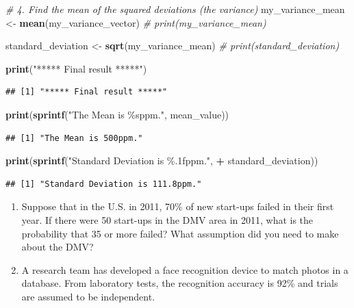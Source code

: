 \documentclass[
]{article}
\newenvironment{Shaded}{\begin{snugshade}}{\end{snugshade}}
\newcommand{\CommentTok}[1]{\textcolor[rgb]{0.56,0.35,0.01}{\textit{#1}}}
\newcommand{\FunctionTok}[1]{\textcolor[rgb]{0.13,0.29,0.53}{\textbf{#1}}}
\newcommand{\NormalTok}[1]{#1}
\newcommand{\OtherTok}[1]{\textcolor[rgb]{0.56,0.35,0.01}{#1}}
\newcommand{\SpecialCharTok}[1]{\textcolor[rgb]{0.81,0.36,0.00}{\textbf{#1}}}
\newcommand{\StringTok}[1]{\textcolor[rgb]{0.31,0.60,0.02}{#1}}
\begin{document}
\begin{Shaded}
\begin{Highlighting}[]
\CommentTok{\# 4. Find the mean of the squared deviations (the variance)}
\NormalTok{my\_variance\_mean }\OtherTok{\textless{}{-}} \FunctionTok{mean}\NormalTok{(my\_variance\_vector)}
\CommentTok{\# print(my\_variance\_mean)}

\NormalTok{standard\_deviation }\OtherTok{\textless{}{-}} \FunctionTok{sqrt}\NormalTok{(my\_variance\_mean)}
\CommentTok{\# print(standard\_deviation)}



\FunctionTok{print}\NormalTok{(}\StringTok{"***** Final result *****"}\NormalTok{)}
\end{Highlighting}
\end{Shaded}

\begin{verbatim}
## [1] "***** Final result *****"
\end{verbatim}

\begin{Shaded}
\begin{Highlighting}[]
\FunctionTok{print}\NormalTok{(}\FunctionTok{sprintf}\NormalTok{(}\StringTok{"The Mean is \%sppm."}\NormalTok{, mean\_value))}
\end{Highlighting}
\end{Shaded}

\begin{verbatim}
## [1] "The Mean is 500ppm."
\end{verbatim}

\begin{Shaded}
\begin{Highlighting}[]
\FunctionTok{print}\NormalTok{(}\FunctionTok{sprintf}\NormalTok{(}\StringTok{"Standard Deviation is \%.1fppm."}\NormalTok{, }\SpecialCharTok{+}\NormalTok{ standard\_deviation))}
\end{Highlighting}
\end{Shaded}

\begin{verbatim}
## [1] "Standard Deviation is 111.8ppm."
\end{verbatim}

\begin{enumerate}
\def\labelenumi{\arabic{enumi}.}
\setcounter{enumi}{1}
\item
  Suppose that in the U.S. in 2011, 70\% of new start-ups failed in
  their first year. If there were 50 start-ups in the DMV area in 2011,
  what is the probability that 35 or more failed? What assumption did
  you need to make about the DMV?
\item
  A research team has developed a face recognition device to match
  photos in a database. From laboratory tests, the recognition accuracy
  is 92\% and trials are assumed to be independent.
\end{enumerate}
\end{document}
